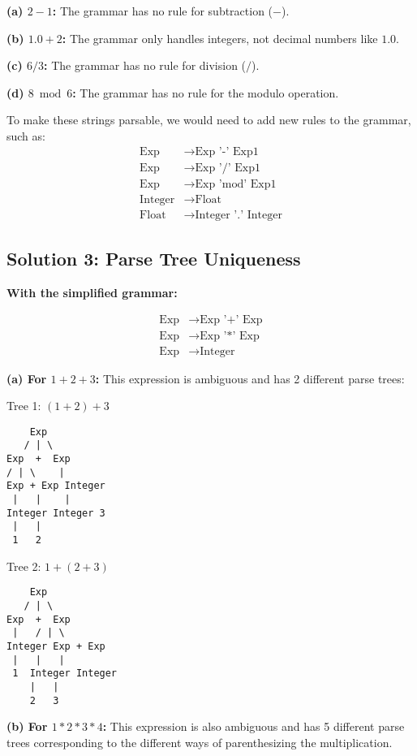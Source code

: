 \documentclass{article}
\theoremstyle{plain}
\theoremstyle{definition}
\theoremstyle{remark}
\begin{document}
\textbf{(a) $2-1$:} The grammar has no rule for subtraction ($-$).

\textbf{(b) $1.0+2$:} The grammar only handles integers, not decimal numbers like $1.0$.

\textbf{(c) $6/3$:} The grammar has no rule for division ($/$).

\textbf{(d) $8 \bmod 6$:} The grammar has no rule for the modulo operation.

To make these strings parsable, we would need to add new rules to the grammar, such as:
\begin{align}
\text{Exp} &\to \text{Exp '-' Exp1} \\
\text{Exp} &\to \text{Exp '/' Exp1} \\
\text{Exp} &\to \text{Exp 'mod' Exp1} \\
\text{Integer} &\to \text{Float} \\
\text{Float} &\to \text{Integer '.' Integer}
\end{align}

\subsection{Solution 3: Parse Tree Uniqueness}

\textbf{With the simplified grammar:}

\begin{align}
\text{Exp} &\to \text{Exp '+' Exp} \\
\text{Exp} &\to \text{Exp '*' Exp} \\
\text{Exp} &\to \text{Integer}
\end{align}

\textbf{(a) For $1+2+3$:} This expression is ambiguous and has 2 different parse trees:

Tree 1: $(1+2)+3$
\begin{verbatim}
    Exp
   / | \
Exp  +  Exp
/ | \    |
Exp + Exp Integer
 |   |    |
Integer Integer 3
 |   |
 1   2
\end{verbatim}

Tree 2: $1+(2+3)$
\begin{verbatim}
    Exp
   / | \
Exp  +  Exp
 |   / | \
Integer Exp + Exp
 |   |   |
 1  Integer Integer
    |   |
    2   3
\end{verbatim}

\textbf{(b) For $1*2*3*4$:} This expression is also ambiguous and has 5 different parse trees corresponding to the different ways of parenthesizing the multiplication.
\end{document}
